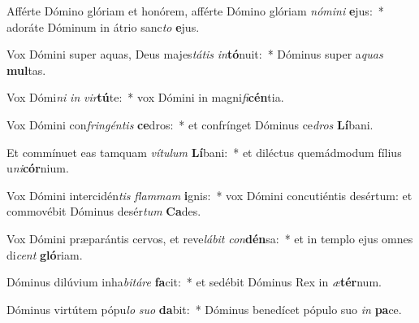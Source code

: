 \item Afférte Dómino glóriam et honórem, afférte Dómino glóriam \textit{nó}\textit{mi}\textit{ni} \textbf{e}jus:~* adoráte Dóminum in átrio sanc\textit{to} \textbf{e}jus.
\item Vox Dómini super aquas, Deus majes\textit{tá}\textit{tis} \textit{in}\textbf{tó}nuit:~* Dóminus super a\textit{quas} \textbf{mul}tas.
\item Vox Dómi\textit{ni} \textit{in} \textit{vir}\textbf{tú}te:~* vox Dómini in magni\textit{fi}\textbf{cén}tia.
\item Vox Dómini con\textit{frin}\textit{gén}\textit{tis} \textbf{ce}dros:~* et confrínget Dóminus ce\textit{dros} \textbf{Lí}bani.
\item Et commínuet eas tamquam \textit{ví}\textit{tu}\textit{lum} \textbf{Lí}bani:~* et diléctus quemádmodum fílius u\textit{ni}\textbf{cór}nium.
\item Vox Dómini intercidén\textit{tis} \textit{flam}\textit{mam} \textbf{i}gnis:~* vox Dómini concutiéntis desértum: et commovébit Dóminus desér\textit{tum} \textbf{Ca}des.
\item Vox Dómini præparántis cervos, et reve\textit{lá}\textit{bit} \textit{con}\textbf{dén}sa:~* et in templo ejus omnes di\textit{cent} \textbf{gló}riam.
\item Dóminus dilúvium inha\textit{bi}\textit{tá}\textit{re} \textbf{fa}cit:~* et sedébit Dóminus Rex in \textit{æ}\textbf{tér}num.
\item Dóminus virtútem pópu\textit{lo} \textit{su}\textit{o} \textbf{da}bit:~* Dóminus benedícet pópulo suo \textit{in} \textbf{pa}ce.
